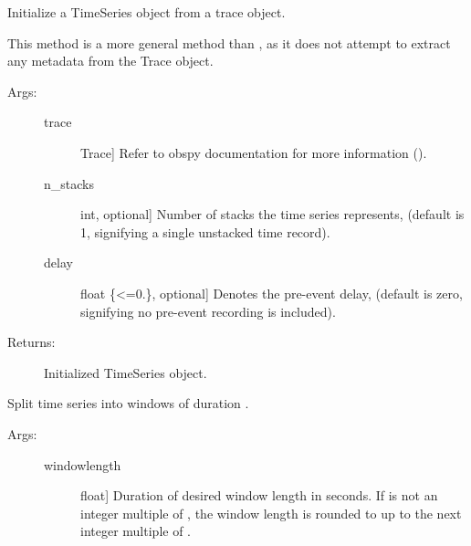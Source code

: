 \documentclass[letterpaper,10pt,english,openany,oneside]{sphinxmanual}
\begin{document}
\begin{fulllineitems}
\begin{fulllineitems}
\label{\detokenize{index:sigpropy.TimeSeries.from_trace}}
Initialize a TimeSeries object from a trace object.

This method is a more general method than , 
as it does not attempt to extract any metadata from the Trace 
object.
\begin{description}
\item[{Args:}] \leavevmode\begin{description}
\item[{trace}] \leavevmode{[}Trace{]}
Refer to obspy documentation for more information
().

\item[{n\_stacks}] \leavevmode{[}int, optional{]}
Number of stacks the time series represents, (default is
1, signifying a single unstacked time record).

\item[{delay}] \leavevmode{[}float \{\textless{}=0.\}, optional{]}
Denotes the pre-event delay, (default is zero, 
signifying no pre-event recording is included).

\end{description}

\item[{Returns:}] \leavevmode
Initialized TimeSeries object.

\end{description}

\end{fulllineitems}


\begin{fulllineitems}
\label{\detokenize{index:sigpropy.TimeSeries.split}}
Split time series into windows of duration .
\begin{description}
\item[{Args:}] \leavevmode\begin{description}
\item[{windowlength}] \leavevmode{[}float{]}
Duration of desired window length in seconds. If 
 is not an integer multiple of , the 
window length is rounded to up to the next integer
multiple of .


\end{description}
\end{description}
\end{fulllineitems}
\end{fulllineitems}
\end{document}
